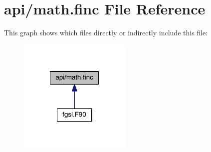 \hypertarget{math_8finc}{\section{api/math.finc File Reference}
\label{math_8finc}
}
This graph shows which files directly or indirectly include this file\-:\nopagebreak
\begin{figure}[H]
\begin{center}
\leavevmode
\includegraphics[width=152pt]{math_8finc__dep__incl}
\end{center}
\end{figure}
